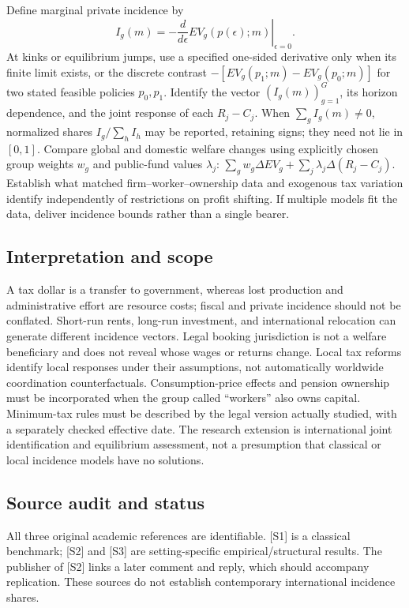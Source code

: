 \documentclass[11pt,a4paper]{article}
\begin{document}
Define marginal private incidence by
\[
 I_g(m)=-\left.\frac{d}{d\epsilon}EV_g(p(\epsilon);m)\right|_{\epsilon=0}.
\]
At kinks or equilibrium jumps, use a specified one-sided derivative only when its finite limit exists, or the discrete contrast $-[EV_g(p_1;m)-EV_g(p_0;m)]$ for two stated feasible policies $p_0,p_1$. Identify the vector $(I_g(m))_{g=1}^{G}$, its horizon dependence, and the joint response of each $R_j-C_j$. When $\sum_g I_g(m)\neq0$, normalized shares $I_g/\sum_h I_h$ may be reported, retaining signs; they need not lie in $[0,1]$. Compare global and domestic welfare changes using explicitly chosen group weights $w_g$ and public-fund values $\lambda_j$: $\sum_gw_g\Delta EV_g+\sum_j\lambda_j\Delta(R_j-C_j)$. Establish what matched firm--worker--ownership data and exogenous tax variation identify independently of restrictions on profit shifting. If multiple models fit the data, deliver incidence bounds rather than a single bearer.

\subsection*{Interpretation and scope}
A tax dollar is a transfer to government, whereas lost production and administrative effort are resource costs; fiscal and private incidence should not be conflated. Short-run rents, long-run investment, and international relocation can generate different incidence vectors. Legal booking jurisdiction is not a welfare beneficiary and does not reveal whose wages or returns change. Local tax reforms identify local responses under their assumptions, not automatically worldwide coordination counterfactuals. Consumption-price effects and pension ownership must be incorporated when the group called “workers” also owns capital. Minimum-tax rules must be described by the legal version actually studied, with a separately checked effective date. The research extension is international joint identification and equilibrium assessment, not a presumption that classical or local incidence models have no solutions.

\subsection*{Source audit and status}
All three original academic references are identifiable. [S1] is a classical benchmark; [S2] and [S3] are setting-specific empirical/structural results. The publisher of [S2] links a later comment and reply, which should accompany replication. These sources do not establish contemporary international incidence shares.
\end{document}
